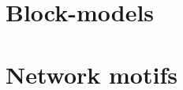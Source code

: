\documentclass[12pt]{report}
\begin{document}
\section{Block-models} 
\section{Network motifs} 

\newpage
{\footnotesize

% 

}
  
\end{document}

